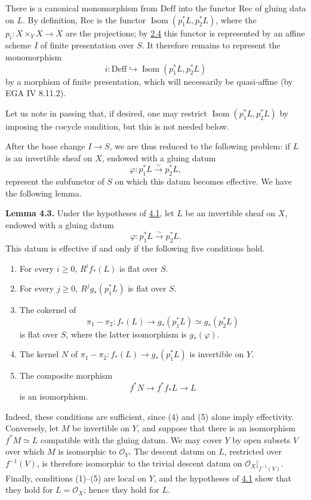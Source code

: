 
\providecommand{\Isom}{\operatorname{Isom}}
\providecommand{\Coker}{\operatorname{Coker}}
\providecommand{\Ker}{\operatorname{Ker}}
\providecommand{\Supp}{\operatorname{Supp}}
\providecommand{\Ass}{\operatorname{Ass}}

There is a canonical monomorphism from \(\mathrm{Deff}\) into the functor
\(\mathrm{Rec}\) of gluing data on \(L\). By definition,
\(\mathrm{Rec}\) is the functor
\(\Isom(p_1^*L,p_2^*L)\), where the
\(p_i:X\times_YX\to X\) are the projections; by \hyperlink{sga6.e12.lem.2-4}{2.4} this functor is
represented by an affine scheme \(I\) of finite presentation over \(S\). It
therefore remains to represent the monomorphism
\[
  i:\mathrm{Deff}\hookrightarrow \Isom(p_1^*L,p_2^*L)
\]
by a morphism of finite presentation, which will necessarily be quasi-affine
(by EGA IV 8.11.2).

Let us note in passing that, if desired, one may restrict
\(\Isom(p_1^*L,p_2^*L)\) by imposing the cocycle condition, but this is not
needed below.

After the base change \(I\to S\), we are thus reduced to the following
problem: if \(L\) is an invertible sheaf on \(X\), endowed with a gluing datum
\[
  \varphi:p_1^*L\xrightarrow{\sim}p_2^*L,
\]
represent the subfunctor of \(S\) on which this datum becomes effective. We
have the following lemma.

\textbf{Lemma 4.3.} Under the hypotheses of \hyperlink{sga6.e12.prop.4-1}{4.1}, let \(L\) be an invertible
sheaf on \(X\), endowed with a gluing datum
\[
  \varphi:p_1^*L\xrightarrow{\sim}p_2^*L.
\]
This datum is effective if and only if the following five conditions hold.
\begin{enumerate}[label=\arabic*)]
\item For every \(i\geq0\), \(R^if_*(L)\) is flat over \(S\).
\item For every \(j\geq0\), \(R^jg_*(p_1^*L)\) is flat over \(S\).
\item The cokernel of
\[
  \pi_1-\pi_2:f_*(L)\longrightarrow
  g_*(p_1^*L)\simeq g_*(p_2^*L)
\]
is flat over \(S\), where the latter isomorphism is \(g_*(\varphi)\).
\item The kernel \(N\) of
\(\pi_1-\pi_2:f_*(L)\to g_*(p_1^*L)\) is invertible on \(Y\).
\item The composite morphism
\[
  f^*N\longrightarrow f^*f_*L\longrightarrow L
\]
is an isomorphism.
\end{enumerate}

\newpage
Indeed, these conditions are sufficient, since (4) and (5) alone imply
effectivity. Conversely, let \(M\) be invertible on \(Y\), and suppose that
there is an isomorphism \(f^*M\simeq L\) compatible with the gluing datum. We
may cover \(Y\) by open subsets \(V\) over which \(M\) is isomorphic to
\(\mathcal O_Y\). The descent datum on \(L\), restricted over
\(f^{-1}(V)\), is therefore isomorphic to the trivial descent datum on
\(\mathcal O_X|_{f^{-1}(V)}\). Finally, conditions (1)--(5) are local on
\(Y\), and the hypotheses of \hyperlink{sga6.e12.prop.4-1}{4.1} show that they hold for
\(L=\mathcal O_X\); hence they hold for \(L\).

